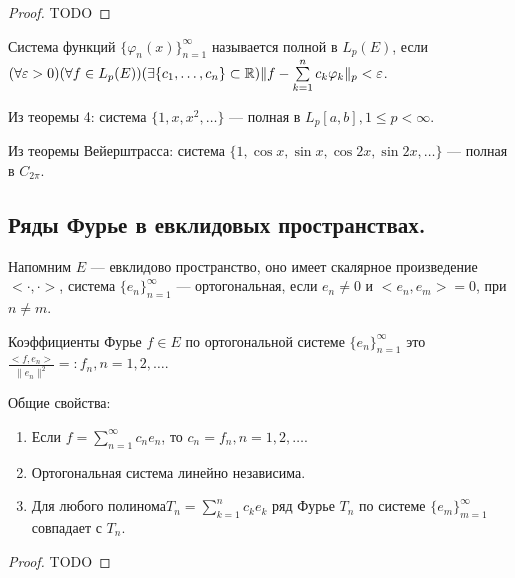 \begin{proof}
	TODO
\end{proof}

\begin{Def}
	Система функций $\{\varphi_n(x)\}_{n=1}^\infty$ называется полной в $L_p(E)$, если \\$(\forall\varepsilon>0)(\forall f\in L_p(E))(\exists \{c_1,\ldots,c_n\}\subset\mathbb{R})\|f-\sum\limits_{k=1}^n c_k\varphi_k\|_p<\varepsilon$.
\end{Def}

\begin{corollary}
	 Из теоремы 4: система $\{1,x,x^2,\ldots\}$ --- полная в $L_p[a,b], 1\leqslant p<\infty$.
\end{corollary}
 
\begin{corollary}
	Из теоремы Вейерштрасса: система $\{1,\cos x,\sin x, \cos 2x, \sin 2x,\ldots\}$ --- полная в $C_{2\pi}$.
\end{corollary}

\subsection{Ряды Фурье в евклидовых пространствах.}
Напомним $E$ --- евклидово пространство, оно имеет скалярное произведение $<\cdot,\cdot>$, система $\{e_n\}_{n=1}^\infty$ --- ортогональная, если $e_n\ne 0$ и $<e_n,e_m>=0$, при $n\ne m$.

Коэффициенты Фурье $f\in E$ по ортогональной системе $\{e_n\}_{n=1}^\infty$ это $\frac{<f,e_n>}{\|e_n\|^2}=:f_n, n=1,2,\ldots$.

Общие свойства:
\begin{enumerate}
	\item Если $f=\sum\limits_{n=1}^\infty c_n e_n$, то $c_n=f_n,n=1,2,\ldots$.
	\item Ортогональная система линейно независима.
	\item Для любого полинома$T_n=\sum\limits_{k=1}^n c_ke_k$ ряд Фурье $T_n$ по системе $\{e_m\}_{m=1}^\infty$ совпадает с $T_n$.
\end{enumerate}
\begin{proof}
TODO
\end{proof}


























